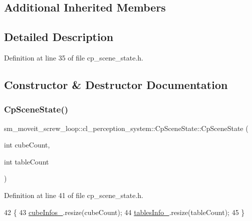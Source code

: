 \subsection*{Additional Inherited Members}


\subsection{Detailed Description}


Definition at line 35 of file cp\+\_\+scene\+\_\+state.\+h.



\subsection{Constructor \& Destructor Documentation}
\mbox{\label{classsm__moveit__screw__loop_1_1cl__perception__system_1_1CpSceneState_a3bd37c24f255cce5b53d52f31547f8d3}} 
\subsubsection{\texorpdfstring{Cp\+Scene\+State()}{CpSceneState()}}
{\footnotesize\ttfamily sm\+\_\+moveit\+\_\+screw\+\_\+loop\+::cl\+\_\+perception\+\_\+system\+::\+Cp\+Scene\+State\+::\+Cp\+Scene\+State (\begin{DoxyParamCaption}\item[{int}]{cube\+Count,  }\item[{int}]{table\+Count }\end{DoxyParamCaption})\hspace{0.3cm}{\ttfamily [inline]}}



Definition at line 41 of file cp\+\_\+scene\+\_\+state.\+h.


\begin{DoxyCode}
42             \{
43                 \hyperlink{classsm__moveit__screw__loop_1_1cl__perception__system_1_1CpSceneState_afef6eaf7eb94cf74b9333a373b2fb35d}{cubeInfos\_}.resize(cubeCount);
44                 \hyperlink{classsm__moveit__screw__loop_1_1cl__perception__system_1_1CpSceneState_a13c7fd5645885ad697cedb48edbb3f09}{tablesInfo\_}.resize(tableCount);
45             \}
\end{DoxyCode}



